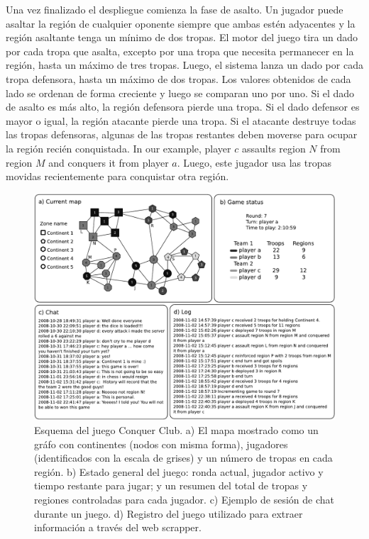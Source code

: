 \documentclass[a4paper,10pt]{book}
\theoremstyle{definition}
\begin{document}

Una vez finalizado el despliegue comienza la fase de asalto.
%
Un jugador puede asaltar la región de cualquier oponente siempre que ambas estén adyacentes y la región asaltante tenga un mínimo de dos tropas.
%
El motor del juego tira un dado por cada tropa que asalta, excepto por una tropa que necesita permanecer en la región, hasta un máximo de tres tropas.
%
Luego, el sistema lanza un dado por cada tropa defensora, hasta un máximo de dos tropas.
%
Los valores obtenidos de cada lado se ordenan de forma creciente y luego se comparan uno por uno.
%
Si el dado de asalto es más alto, la región defensora pierde una tropa.
%
Si el dado defensor es mayor o igual, la región atacante pierde una tropa.
%
Si el atacante destruye todas las tropas defensoras, algunas de las tropas restantes deben moverse para ocupar la región recién conquistada.
%
In our example, player $c$ assaults region $N$ from region $M$ and conquers it from player $a$.
%
Luego, este jugador usa las tropas movidas recientemente para conquistar otra región.

\begin{figure}[ht!]
    \centering
    \includegraphics[width=0.8\linewidth]{figures/Fig5}
    \caption{
    Esquema del juego Conquer Club. a) El mapa mostrado como un gráfo con continentes (nodos con misma forma), jugadores (identificados con la escala de grises) y un n\'umero de tropas en cada región.
    b) Estado general del juego: ronda actual, jugador activo y tiempo restante para jugar; y un resumen del total de tropas y regiones controladas para cada jugador.
    c) Ejemplo de sesión de chat durante un juego.
    d) Registro del juego utilizado para extraer información a través del web scrapper.
    }
    \label{conquerImage}
\end{figure}
\end{document}
